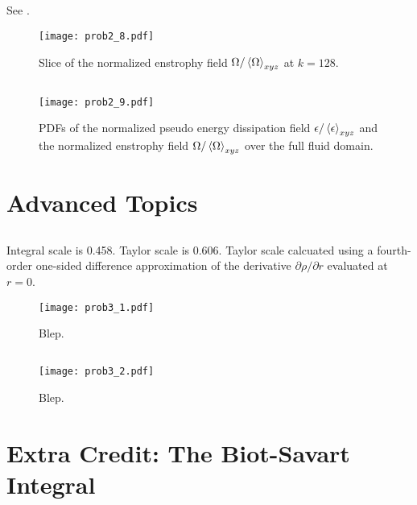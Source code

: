 \documentclass[11pt]{article}
\begin{document}
\subsection{}

See .

\begin{figure}[t]
\centering
\texttt{[image: prob2\_8.pdf]}
\\[6pt]
\caption{Slice of the normalized enstrophy field $\Omega / \left< \Omega \right>_{xyz}$ at $k=128$.}
\label{fig:prob_2_8_omega_normalized_slice}
\end{figure}

\subsection{}

\begin{figure}[t]
\centering
\texttt{[image: prob2\_9.pdf]}
\\[6pt]
\caption{PDFs of the normalized pseudo energy dissipation field $\epsilon / \left< \epsilon \right>_{xyz}$ and the normalized enstrophy field $\Omega / \left< \Omega \right>_{xyz}$ over the full fluid domain.}
\label{fig:prob_2_9_energy_and_enstrophy_PDFs}
\end{figure}

\section{Advanced Topics}

\subsection{}

Integral scale is 0.458. Taylor scale is 0.606. Taylor scale calcuated using a fourth-order one-sided difference approximation of the derivative $\partial \rho / \partial r$ evaluated at $r=0$.

\begin{figure}[t]
\centering
\texttt{[image: prob3\_1.pdf]}
\\[6pt]
\caption{Blep.}
\label{fig:prob_3_1_autocorrelation}
\end{figure}

\subsection{}

\begin{figure}[t]
\centering
\texttt{[image: prob3\_2.pdf]}
\\[6pt]
\caption{Blep.}
\label{fig:prob_3_2_joint_pdf}
\end{figure}

\section{Extra Credit: The Biot-Savart Integral}

\end{document}
